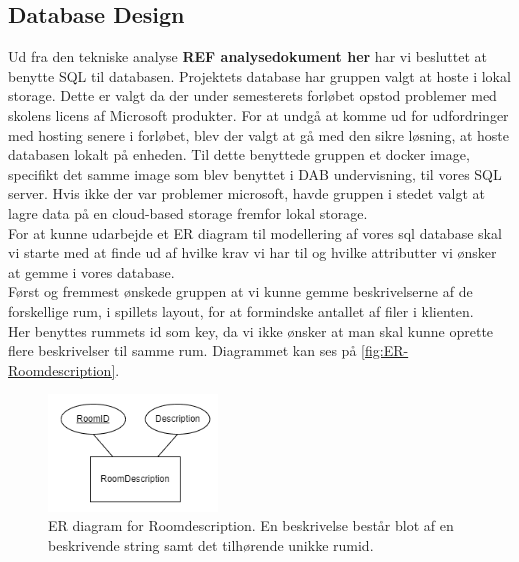 \subsection{Database Design}
\label{ssec:DB Design}
Ud fra den tekniske analyse \textbf{REF analysedokument her} har vi besluttet at benytte SQL til databasen. 
Projektets database har gruppen valgt at hoste i lokal storage. Dette er valgt da der under semesterets forløbet opstod problemer med skolens licens af Microsoft produkter. For at undgå at komme ud for udfordringer med hosting senere i forløbet, blev der valgt at gå med den sikre løsning, at hoste databasen lokalt på enheden. Til dette benyttede gruppen et docker image\cite{SQL server with docker}, specifikt det samme image som blev benyttet i DAB undervisning, til vores SQL server.
Hvis ikke der var problemer microsoft, havde gruppen i stedet valgt at lagre data på en cloud-based storage fremfor lokal storage.\\

\noindent For at kunne udarbejde et ER diagram til modellering af vores sql database skal vi starte med at finde ud af hvilke krav vi har til og hvilke attributter vi ønsker at gemme i vores database.\\
Først og fremmest ønskede gruppen at vi kunne gemme beskrivelserne af de forskellige rum, i spillets layout, for at formindske antallet af filer i klienten.\\ 
Her benyttes rummets id som key, da vi ikke ønsker at man skal kunne oprette flere beskrivelser til samme rum. Diagrammet kan ses på \autoref{fig:ER-Roomdescription}.

\begin{figure}[H]
\centering
\includegraphics[width = 0.4\textwidth]{02-Body/Images/ER-RoomDescription.PNG}
\caption{ER diagram for Roomdescription. En beskrivelse består blot af en beskrivende string samt det tilhørende unikke rumid.}
\label{fig:ER-Roomdescription}
\end{figure}

